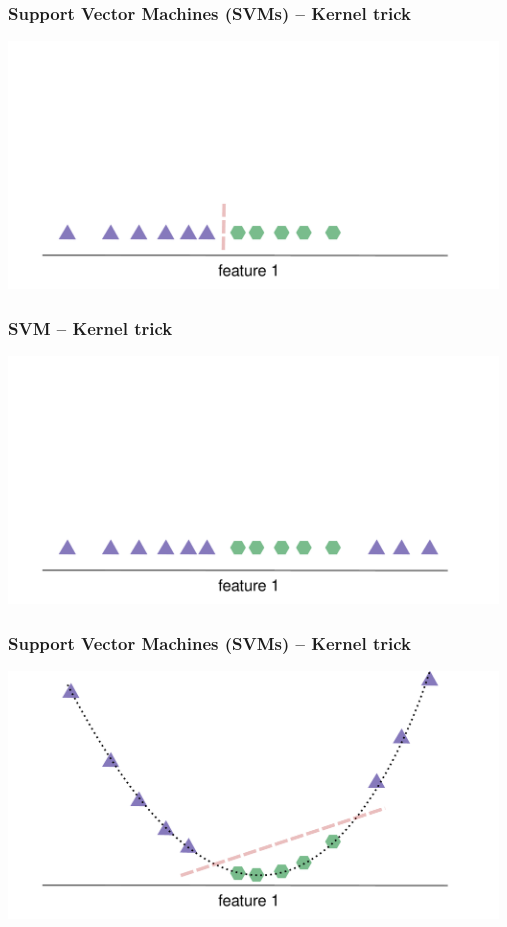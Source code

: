 \documentclass[aspectratio=169]{beamer}
\begin{document}
\begin{frame}
  \frametitle{Support Vector Machines (SVMs) -- Kernel trick}
  \begin{center}
    \includegraphics[width=13.0cm]{images/svm_kernel_trick_1.pdf}
  \end{center}
\end{frame}

\begin{frame}
  \frametitle{SVM -- Kernel trick}
  \begin{center}
    \includegraphics[width=13.0cm]{images/svm_kernel_trick_2.pdf}
  \end{center}
\end{frame}

\begin{frame}
  \frametitle{Support Vector Machines (SVMs) -- Kernel trick}
  \begin{center}
    \includegraphics[width=13.0cm]{images/svm_kernel_trick_3.pdf}
  \end{center}
\end{frame}
\end{document}

